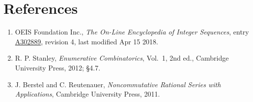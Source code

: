 \documentclass[11pt]{article}
\theoremstyle{definition}
\begin{document}
\section{References}

\begin{enumerate}

\item OEIS Foundation Inc., \emph{The On-Line Encyclopedia of Integer Sequences}, entry \href{https://oeis.org/A302889}{A302889}, revision 4, last modified Apr 15 2018.

\item R. P. Stanley, \emph{Enumerative Combinatorics}, Vol.~1, 2nd ed., Cambridge University Press, 2012; \S4.7.

\item J. Berstel and C. Reutenauer, \emph{Noncommutative Rational Series with Applications}, Cambridge University Press, 2011.

\end{enumerate}
\end{document}
